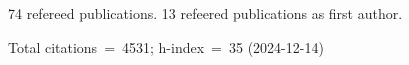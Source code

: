 74 refereed publications. 13 refeered publications as first author.

Total citations~=~4531; h-index~=~35 (2024-12-14)